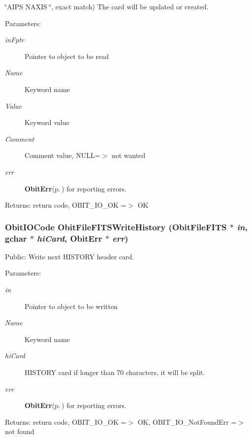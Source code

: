 \char`\"{}AIPS   NAXIS   \char`\"{}, exact match) The card will be updated or created. \begin{Desc}
\item[Parameters:]
\begin{description}
\item[{\em in\-Fptr}]Pointer to object to be read \item[{\em Name}]Keyword name \item[{\em Value}]Keyword value \item[{\em Comment}]Comment value, NULL=$>$ not wanted \item[{\em err}]{\bf Obit\-Err}{\rm (p.\,\pageref{structObitErr})} for reporting errors. \end{description}
\end{Desc}
\begin{Desc}
\item[Returns:]return code, OBIT\_\-IO\_\-OK =$>$ OK \end{Desc}
\subsubsection{\setlength{\rightskip}{0pt plus 5cm}Obit\-IOCode Obit\-File\-FITSWrite\-History ({\bf Obit\-File\-FITS} $\ast$ {\em in}, gchar $\ast$ {\em hi\-Card}, {\bf Obit\-Err} $\ast$ {\em err})}\label{ObitFileFITS_8h_a28}


Public: Write next HISTORY header card. 

\begin{Desc}
\item[Parameters:]
\begin{description}
\item[{\em in}]Pointer to object to be written \item[{\em Name}]Keyword name \item[{\em hi\-Card}]HISTORY card if longer than 70 characters, it will be split. \item[{\em err}]{\bf Obit\-Err}{\rm (p.\,\pageref{structObitErr})} for reporting errors. \end{description}
\end{Desc}
\begin{Desc}
\item[Returns:]return code, OBIT\_\-IO\_\-OK =$>$ OK, OBIT\_\-IO\_\-Not\-Found\-Err =$>$ not found \end{Desc}
